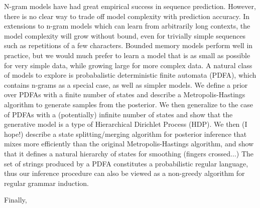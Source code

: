 {N-gram models have had great empirical success in sequence prediction.  However, there is no clear way to trade off model complexity with prediction accuracy.  In extensions to n-gram models which can learn from arbitrarily long contexts, the model complexity will grow without bound, even for trivially simple sequences such as repetitions of a few characters.  Bounded memory models perform well in practice, but we would much prefer to learn a model that is as small as possible for very simple data, while growing large for more complex data.  A natural class of models to explore is probabalistic deterministic finite automata (PDFA), which contains n-grams as a special case, as well as simpler models.  We define a prior over PDFAs with a finite number of states and describe a Metropolis-Hastings algorithm to generate samples from the posterior.  We then generalize to the case of PDFAs with a (potentially) infinite number of states and show that the generative model is a type of Hierarchical Dirichlet Process (HDP).  We then (I hope!) describe a state splitting/merging algorithm for posterior inference that mixes more efficiently than the original Metropolis-Hastings algorithm, and show that it defines a natural hierarchy of states for smoothing (fingers crossed...)  The set of strings produced by a PDFA constitutes a probabilistic regular language, thus our inference procedure can also be viewed as a non-greedy algorithm for regular grammar induction.

Finally, }